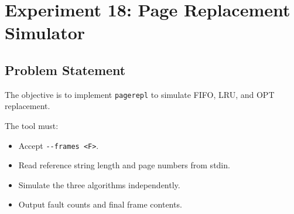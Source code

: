
\section{Experiment 18: Page Replacement Simulator}

\subsection{Problem Statement}
The objective is to implement \texttt{pagerepl} to simulate FIFO, LRU, and OPT replacement.

The tool must:
\begin{itemize}
    \item Accept \verb|--frames <F>|.
    \item Read reference string length and page numbers from stdin.
    \item Simulate the three algorithms independently.
    \item Output fault counts and final frame contents.
\end{itemize}

